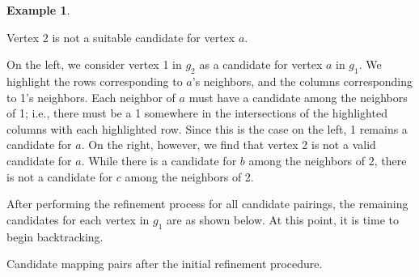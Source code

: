 \documentclass[12pt]{thesis}
\theoremstyle{plain}
\theoremstyle{definition}
\newtheorem{example}[theorem]{Example}
\theoremstyle{remark}
\begin{document}
\begin{example}
\begin{center}
\begin{minipage}{0.3\textwidth}
\footnotesize\singlespacing Vertex 2 is not a suitable candidate for vertex $a$.
\end{minipage}
\begin{minipage}{0.1\textwidth}
\hfill
\end{minipage}
\end{center}

\bigskip

On the left, we consider vertex 1 in $g_2$ as a candidate for vertex $a$ in $g_1$. We highlight the rows corresponding to $a$'s neighbors, and the columns corresponding to 1's neighbors. Each neighbor of $a$ must have a candidate among the neighbors of 1; i.e., there must be a 1 somewhere in the intersections of the highlighted columns with each highlighted row. Since this is the case on the left, 1 remains a candidate for $a$. On the right, however, we find that vertex 2 is not a valid candidate for $a$. While there is a candidate for $b$ among the neighbors of 2, there is not a candidate for $c$ among the neighbors of 2.

After performing the refinement process for all candidate pairings, the remaining candidates for each vertex in $g_1$ are as shown below. At this point, it is time to begin backtracking.

\vspace{5pt}
\begin{center}
\footnotesize\singlespacing Candidate mapping pairs after the initial refinement procedure.
\end{center}
\vspace{-5pt}


\end{example}
\end{document}
